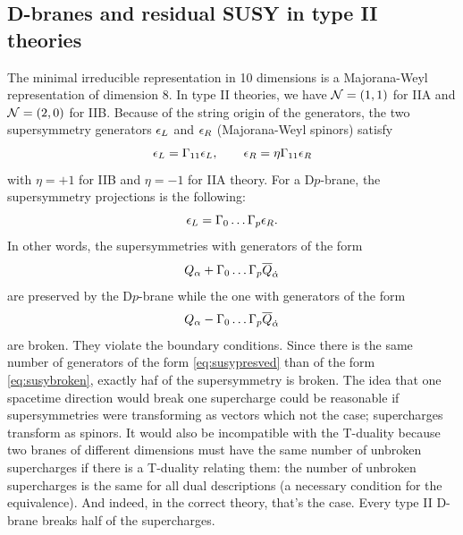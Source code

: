 
    \subsection{D-branes and residual SUSY in type II theories}

        The minimal irreducible representation in 10 dimensions is a Majorana-Weyl representation of dimension 8. In type II theories, we have $\mathcal{N}=(1,1)$ for IIA and $\mathcal{N}=(2,0)$ for IIB. Because of the string origin of the generators, the two supersymmetry generators $\epsilon_L$ and $\epsilon_R$ (Majorana-Weyl spinors) satisfy
        \begin{equation}
            \epsilon_L=\Gamma_{11}\epsilon_L,\qquad \epsilon_R=\eta\Gamma_{11}\epsilon_R
        \end{equation}
        with $\eta=+1$ for IIB and $\eta=-1$ for IIA theory. For a D$p$-brane, the supersymmetry projections is the following:
        \begin{equation}
            \epsilon_L=\Gamma_0\dots\Gamma_p\epsilon_R.
        \end{equation}
        In other words, the supersymmetries with generators of the form
        \begin{equation}
            Q_\alpha+\Gamma_0\dots\Gamma_p\overline{Q}_{\dot{\alpha}}\label{eq:susypresved}
        \end{equation}
        are preserved by the D$p$-brane while the one with generators of the form
        \begin{equation}
            Q_\alpha-\Gamma_0\dots\Gamma_p\overline{Q}_{\dot{\alpha}}\label{eq:susybroken}
        \end{equation}
        are broken. They violate the boundary conditions. Since there is the same number of generators of the form \eqref{eq:susypresved} than of the form \eqref{eq:susybroken}, exactly haf of the supersymmetry is broken. The idea that one spacetime direction would break one supercharge could be reasonable if supersymmetries were transforming as vectors which not the case; supercharges transform as spinors. It would also be incompatible with the T-duality because two branes of different dimensions must have the same number of unbroken supercharges if there is a T-duality relating them: the number of unbroken supercharges is the same for all dual descriptions (a necessary condition for the equivalence). And indeed, in the correct theory, that's the case. Every type II D-brane breaks half of the supercharges.

